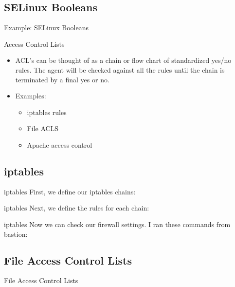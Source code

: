 \documentclass{beamer}
\begin{document}
\subsection{SELinux Booleans}

\begin{frame}{Example: SELinux Booleans}

\end{frame}

\begin{frame}{Access Control Lists}
\begin{itemize}
\item ACL's can be thought of as a chain or flow chart of standardized yes/no rules. The agent will be checked against all the rules until the chain is terminated by a final yes or no.
\item Examples:
\begin{itemize}
\item iptables rules
\item File ACLS
\item Apache access control
\end{itemize}
\end{itemize}
\end{frame}

\subsection{iptables}

\begin{frame}{iptables}
First, we define our iptables chains:

\end{frame}

\begin{frame}{iptables}
Next, we define the rules for each chain:

\end{frame}

\begin{frame}{iptables}
Now we can check our firewall settings. I ran these commands from bastion:

\end{frame}

\subsection{File Access Control Lists}

\begin{frame}{File Access Control Lists}

\end{frame}
\end{document}
